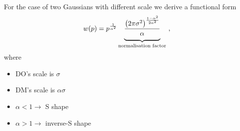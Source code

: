 \begin{frame}
For the case of two Gaussians with different scale we derive a functional form
\begin{equation}
	w(p) =
	p^{\frac{1}{\alpha^2}}
	\underbrace{
	\frac{\left(2\pi\sigma^2\right)^{\frac{1-\alpha^2}{2\alpha^2}}}{\alpha\strut}
	}_{\text{normalisation factor}}
	~,
\end{equation}
where
\begin{itemize}
  \item DO's scale is $\sigma$
  \item DM's scale is $\alpha\sigma$
  \item $\alpha < 1 \to$ S shape
  \item $\alpha > 1 \to	$ inverse-S shape
\end{itemize}
\end{frame}




